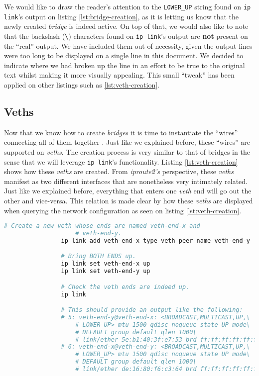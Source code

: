             We would like to draw the reader's attention to the \texttt{LOWER\_UP} string found on \texttt{ip link}'s output on listing \ref{lst:bridge-creation}, as it is letting us know that the newly created \textit{bridge} is indeed active. On top of that, we would also like to note that the backslash (\texttt{\textbackslash}) characters found on \texttt{ip link}'s output are \textbf{not} present on the ``real'' output. We have included them out of necessity, given the output lines were too long to be displayed on a single line in this document. We decided to indicate where we had broken up the line in an effort to be true to the original text whilst making it more visually appealing. This small ``tweak'' has been applied on other listings such as \ref{lst:veth-creation}.\\

        \subsection{Veths}
            Now that we know how to create \textit{bridges} it is time to instantiate the ``wires'' connecting all of them together \cite{bib:man-veth}. Just like we explained before, these ``wires'' are supported on \textit{veths}. The creation process is very similar to that of bridges in the sense that we will leverage \texttt{ip link}'s functionality. Listing \ref{lst:veth-creation} shows how these \textit{veths} are created. From \textit{iproute2's} perspective, these \textit{veths} manifest as two different interfaces that are nonetheless very intimately related. Just like we explained before, everything that enters one \textit{veth} end will go out the other and vice-versa. This relation is made clear by how these \textit{veths} are displayed when querying the network configuration as seen on listing \ref{lst:veth-creation}.\\

            \begin{lstlisting}[language = bash, caption = Instantiating a Virtual Ethernet Interface., label = lst:veth-creation]
                # Create a new veth whose ends are named veth-end-x and
                    # veth-end-y.
                ip link add veth-end-x type veth peer name veth-end-y

                # Bring BOTH ENDS up.
                ip link set veth-end-x up
                ip link set veth-end-y up

                # Check the veth ends are indeed up.
                ip link

                # This should provide an output like the following:
                # 5: veth-end-y@veth-end-x: <BROADCAST,MULTICAST,UP,\
                    # LOWER_UP> mtu 1500 qdisc noqueue state UP mode\
                    # DEFAULT group default qlen 1000\
                    # link/ether 5e:b1:40:3f:e7:53 brd ff:ff:ff:ff:ff:ff
                # 6: veth-end-x@veth-end-y: <BROADCAST,MULTICAST,UP,\
                    # LOWER_UP> mtu 1500 qdisc noqueue state UP mode\
                    # DEFAULT group default qlen 1000\
                    # link/ether de:16:80:f6:c3:64 brd ff:ff:ff:ff:ff:ff
            \end{lstlisting}

